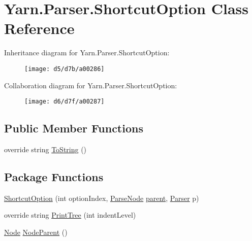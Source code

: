 \hypertarget{a00070}{\section{Yarn.\-Parser.\-Shortcut\-Option Class Reference}
\label{a00070}
}


Inheritance diagram for Yarn.\-Parser.\-Shortcut\-Option\-:
\nopagebreak
\begin{figure}[H]
\begin{center}
\leavevmode
\texttt{[image: d5/d7b/a00286]}
\end{center}
\end{figure}


Collaboration diagram for Yarn.\-Parser.\-Shortcut\-Option\-:
\nopagebreak
\begin{figure}[H]
\begin{center}
\leavevmode
\texttt{[image: d6/d7f/a00287]}
\end{center}
\end{figure}
\subsection*{Public Member Functions}
\begin{DoxyCompactItemize}
\item 
override string \hyperlink{a00063_a18c67cb16090d0889bb9d6c8c6c565f8}{To\-String} ()
\end{DoxyCompactItemize}
\subsection*{Package Functions}
\begin{DoxyCompactItemize}
\item 
\hyperlink{a00070_a2c80b137d65f31b24533987233074605}{Shortcut\-Option} (int option\-Index, \hyperlink{a00063}{Parse\-Node} \hyperlink{a00063_af313a82103fcc2ff5a177dbb06b92f7b}{parent}, \hyperlink{a00064}{Parser} p)
\item 
override string \hyperlink{a00070_a529a2ef1aa6d7226db4ea7f3ea92b8c2}{Print\-Tree} (int indent\-Level)
\item 
\hyperlink{a00054}{Node} \hyperlink{a00063_a580e520a29444fc23ac3660cbe514a09}{Node\-Parent} ()
\end{DoxyCompactItemize}

